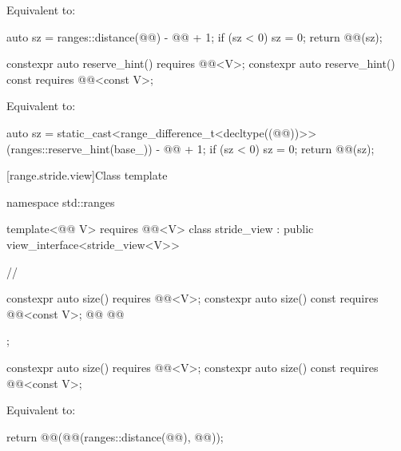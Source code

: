 \documentclass{wg21}
\begin{document}
\begin{itemdescr}
    \pnum
    \effects
    Equivalent to:
    \begin{codeblock}
        auto sz = ranges::distance(@@) - @@ + 1;
        if (sz < 0) sz = 0;
        return @@(sz);
    \end{codeblock}
\end{itemdescr}


\begin{addedblock}
\begin{itemdecl}
    constexpr auto reserve_hint() requires @@<V>;
    constexpr auto reserve_hint() const requires @@<const V>;
\end{itemdecl}

\begin{itemdescr}
    \pnum
    \effects
    Equivalent to:
    \begin{codeblock}
        auto sz = static_cast<range_difference_t<decltype((@@))>>(ranges::reserve_hint(base_)) - @@ + 1;
        if (sz < 0) sz = 0;
        return @@(sz);
    \end{codeblock}
\end{itemdescr}
\end{addedblock}

[range.stride.view]{Class template }

\begin{codeblock}
namespace std::ranges {
template<@@ V>
requires @@<V>
class stride_view : public view_interface<stride_view<V>> {
    //

    constexpr auto size() requires @@<V>;
    constexpr auto size() const requires @@<const V>;
    @@
    @@
};
}
\end{codeblock}

\begin{itemdecl}
    constexpr auto size() requires @@<V>;
    constexpr auto size() const requires @@<const V>;
\end{itemdecl}

\begin{itemdescr}
    \pnum
    \effects
    Equivalent to:
    \begin{codeblock}
        return @@(@@(ranges::distance(@@), @@));
    \end{codeblock}
\end{itemdescr}
\end{document}
